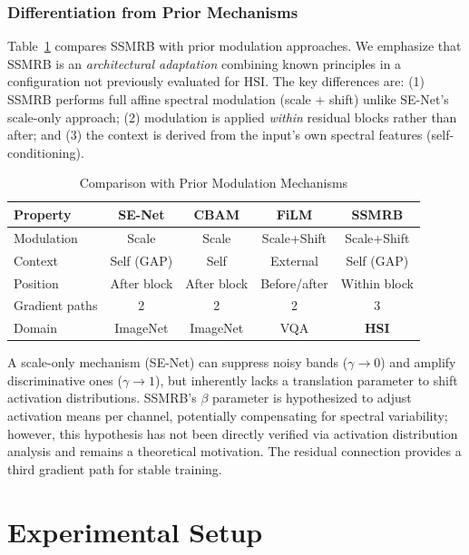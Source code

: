 \documentclass[pdflatex,sn-mathphys-num]{sn-jnl}
\theoremstyle{thmstyleone}
\theoremstyle{thmstyletwo}
\theoremstyle{thmstylethree}
\begin{document}
\subsubsection{Differentiation from Prior Mechanisms}

Table~\ref{tab:modulation_comparison} compares SSMRB with prior modulation approaches. We emphasize that SSMRB is an \textit{architectural adaptation} combining known principles in a configuration not previously evaluated for HSI. The key differences are: (1) SSMRB performs full affine spectral modulation (scale + shift) unlike SE-Net's scale-only approach; (2) modulation is applied \textit{within} residual blocks rather than after; and (3) the context is derived from the input's own spectral features (self-conditioning).

\begin{table}[!t]
\caption{Comparison with Prior Modulation Mechanisms}
\label{tab:modulation_comparison}
\centering

\begin{tabular}{lcccc}
\toprule
\textbf{Property} & \textbf{SE-Net} & \textbf{CBAM} & \textbf{FiLM} & \textbf{SSMRB} \\
\midrule
Modulation & Scale & Scale & Scale+Shift & Scale+Shift \\
Context & Self (GAP) & Self & External & Self (GAP) \\
Position & After block & After block & Before/after & Within block \\
Gradient paths & 2 & 2 & 2 & 3 \\
Domain & ImageNet & ImageNet & VQA & \textbf{HSI} \\
\bottomrule
\end{tabular}
\end{table}

A scale-only mechanism (SE-Net) can suppress noisy bands ($\gamma \to 0$) and amplify discriminative ones ($\gamma \to 1$), but inherently lacks a translation parameter to shift activation distributions. SSMRB's $\beta$ parameter is hypothesized to adjust activation means per channel, potentially compensating for spectral variability; however, this hypothesis has not been directly verified via activation distribution analysis and remains a theoretical motivation. The residual connection provides a third gradient path for stable training.

\section{Experimental Setup}
\end{document}

